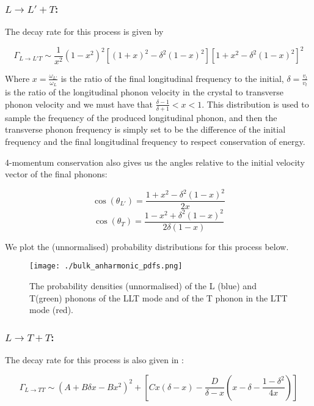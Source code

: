 \documentclass[11pt]{article}
\begin{document}
\subsubsection*{$L\rightarrow L'+T$:}
The decay rate for this process is given by \cite{3}

\begin{equation}
\Gamma_{L\rightarrow L'T} \sim \frac{1}{x^2}(1-x^2)^2\left[(1+x)^2 - \delta^2 (1-x)^2\right]\left[1 + x^2 - \delta^2(1-x)^2\right]^2
\end{equation}

Where $x = \frac{\omega_{L'}}{\omega_L}$ is the ratio of the final longitudinal frequency to the initial, $\delta = \frac{v_l}{v_t}$ is the ratio of
the longitudinal phonon velocity in the crystal to transverse phonon velocity and we must have that $\frac{\delta - 1}{\delta + 1} < x < 1$. This 
distribution is used to sample the frequency of the produced longitudinal phonon, and then the transverse phonon frequency is simply set to be
the difference of the initial frequency and the final longitudinal frequency to respect conservation of energy. 

4-momentum conservation also gives us the angles relative to the initial velocity vector of the final phonons:

\begin{equation}
\cos(\theta_{L'}) = \frac{1 + x^2 - \delta^2(1-x)^2}{2x} 
\end{equation}
\begin{equation}
\cos(\theta_T) = \frac{1 - x^2 + \delta^2(1-x)^2}{2\delta(1-x)}
\end{equation}

We plot the (unnormalised) probability distributions for this process below. 

\begin{figure}[!h]
\begin{center}
\texttt{[image: ./bulk\_anharmonic\_pdfs.png]}
\end{center}
\caption{The probability densities (unnormalised) of the L (blue) and T(green) phonons of the LLT mode and of the T phonon in the LTT mode (red).}
\end{figure}

\subsubsection*{$L\rightarrow T + T$:}
The decay rate for this process is also given in \cite{3}:

\begin{equation}
\Gamma_{L\rightarrow TT} \sim (A + B\delta x - Bx^2)^2 + \left[Cx(\delta - x) - \frac{D}{\delta - x}\left(x - \delta - \frac{1-\delta^2}{4x}\right)\right]
\end{equation}
\end{document}
